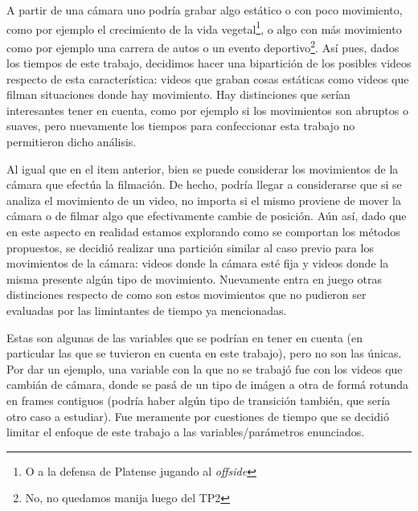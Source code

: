 \begin{LaTeXdescription}
    \item[Tipo Movimiento grabado por la C\'amara] A partir de una c\'amara uno
        podr\'ia grabar algo est\'atico o con poco movimiento, como por ejemplo
        el crecimiento de la vida vegetal\footnote{O a la defensa de Platense
        jugando al \emph{offside}}, o algo con m\'as movimiento como por
        ejemplo una carrera de autos o un evento deportivo\footnote{No, no
        quedamos manija luego del TP2}.  As\'i pues, dados los tiempos de este
        trabajo, decidimos hacer una bipartici\'on de los posibles videos
        respecto de esta caracter\'istica: videos que graban cosas est\'aticas
        como videos que filman situaciones donde hay movimiento.  Hay
        distinciones que ser\'ian interesantes tener en cuenta, como por
        ejemplo si los movimientos son abruptos o suaves, pero nuevamente los
        tiempos para confeccionar esta trabajo no permitieron dicho
        an\'alisis.\medskip

    \item[Tipo de Movimiento de la C\'amara] Al igual que en el item anterior,
        bien se puede considerar los movimientos de la c\'amara que efect\'ua
        la filmaci\'on. De hecho, podr\'ia llegar a considerarse que si se
        analiza el movimiento de un video, no importa si el mismo proviene de
        mover la c\'amara o de filmar algo que efectivamente cambie de
        posici\'on. A\'un as\'i, dado que en este aspecto en realidad estamos
        explorando como se comportan los m\'etodos propuestos, se decidi\'o
        realizar una partici\'on similar al caso previo para los movimientos
        de la c\'amara: videos donde la c\'amara est\'e fija y videos donde
        la misma presente alg\'un tipo de movimiento. Nuevamente entra en juego
        otras distinciones respecto de como son estos movimientos que no
        pudieron ser evaluadas por las limintantes de tiempo ya
        mencionadas.\medskip
\end{LaTeXdescription}

\par Estas son algunas de las variables que se podr\'ian en tener en cuenta (en
particular las que se tuvieron en cuenta en este trabajo), pero no son las
\'unicas. Por dar un ejemplo, una variable con la que no se trabaj\'o fue con
los videos que cambi\'an de c\'amara, donde se pas\'a de un tipo de im\'agen a
otra de form\'a rotunda en frames contiguos (podr\'ia haber alg\'un tipo de
transici\'on tambi\'en, que ser\'ia otro caso a estudiar). Fue meramente por
cuestiones de tiempo que se decidi\'o limitar el enfoque de este trabajo a las
variables/par\'ametros enunciados.
